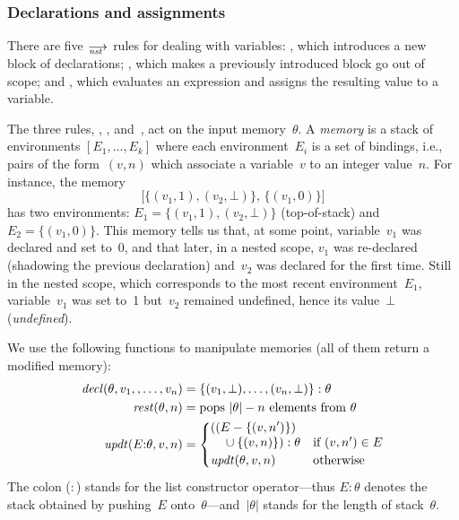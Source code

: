 \subsubsection*{Declarations and assignments}

There are five $\nst$ rules for dealing with variables: , which
introduces a new block of declarations; , which makes a
previously introduced block go out of scope; and , which evaluates
an expression and assigns the resulting value to a variable.

The three rules, , , and~, act on the input
memory~$\theta$.  A \emph{memory} is a stack of environments
$[E_1,\dots,E_k]$ where each environment~$E_i$ is a set of bindings, i.e.,
pairs of the form~$(v,n)$ which associate a variable~$v$ to an integer
value~$n$.  For instance, the memory
\[
  \big[\{(v_1,1),(v_2,\bot)\},\,\{(v_1,0)\}\big]
\]
has two environments: $E_1=\{(v_1,1),(v_2,\bot)\}$ (top-of-stack)
and~$E_2=\{(v_1,0)\}$.  This memory tells us that, at some point,
variable~$v_1$ was declared and set to~0, and that later, in a nested scope,
$v_1$ was re-declared (shadowing the previous declaration) and~$v_2$ was
declared for the first time.  Still in the nested scope, which corresponds
to the most recent environment~$E_1$, variable~$v_1$ was set to~1 but~$v_2$
remained undefined, hence its value~$\bot$ (\emph{undefined}).

We use the following functions to manipulate memories (all of them return a
modified memory):
\begin{align*}
  \memdecl(\theta,v_1,,\dots,v_n)
  &=\{(v_1,\bot),\dots,(v_n,\bot)\}:\theta\\
  \memrest(\theta,n)
  &=\text{pops $\left|\theta\right|-n$ elements from~$\theta$}\\
  \memupdt(E{:}\theta,v,n)
  &=\begin{cases}
    \begin{aligned}[b]
      &((E-\{(v,n')\})\\
      &\quad\null\cup\{(v,n)\}):\theta
    \end{aligned}
    &\text{if~$(v,n')\in{E}$}\\
    \memupdt(\theta,v,n)
    &\text{otherwise}
  \end{cases}
\end{align*}
The colon ($:$) stands for the list constructor operator---thus $E{:}\theta$
denotes the stack obtained by pushing~$E$
onto~$\theta$---and~$\left|\theta\right|$ stands for the length of
stack~$\theta$.

